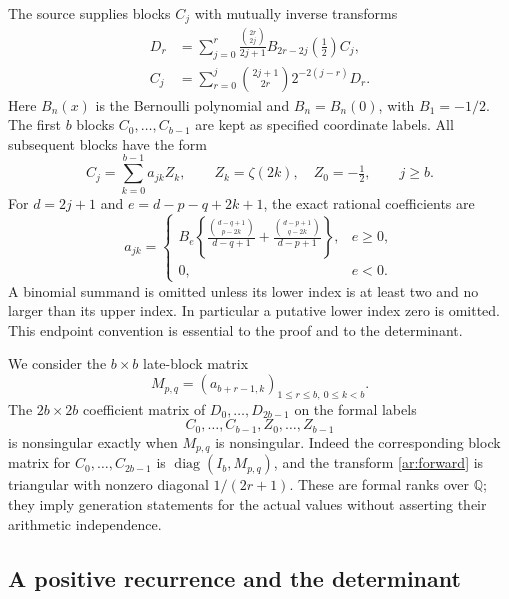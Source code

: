 The source supplies blocks $C_j$ with mutually inverse transforms
\begin{align}
 D_r&=\sum_{j=0}^r
    \frac{\binom{2r}{2j}}{2j+1}B_{2r-2j}(\tfrac12)C_j,
       \label{ar:forward}\\
 C_j&=\sum_{r=0}^j
       \binom{2j+1}{2r}2^{-2(j-r)}D_r.
       \label{ar:backward}
\end{align}
Here $B_n(x)$ is the Bernoulli polynomial and $B_n=B_n(0)$, with
$B_1=-1/2$. The first $b$ blocks $C_0,\ldots,C_{b-1}$ are kept as
specified coordinate labels. All subsequent blocks have the form
\begin{equation}\label{ar:block}
 C_j=\sum_{k=0}^{b-1}a_{jk}Z_k,\qquad
 Z_k=\zeta(2k),\quad Z_0=-\tfrac12,\qquad j\ge b.
\end{equation}
For $d=2j+1$ and $e=d-p-q+2k+1$, the exact rational coefficients are
\begin{equation}\label{ar:entries}
 a_{jk}=\begin{cases}
 B_e\left\{
 \displaystyle\frac{\binom{d-q+1}{p-2k}}{d-q+1}
 +\displaystyle\frac{\binom{d-p+1}{q-2k}}{d-p+1}
 \right\},&e\ge0,\\[6pt]
 0,&e<0.
 \end{cases}
\end{equation}
A binomial summand is omitted unless its lower index is at least two
and no larger than its upper index. In particular a putative lower
index zero is omitted. This endpoint convention is essential to the
proof and to the determinant.

We consider the $b\times b$ late-block matrix
\begin{equation}\label{ar:M}
 M_{p,q}=(a_{b+r-1,k})_{1\le r\le b,\ 0\le k<b}.
\end{equation}
The $2b\times2b$ coefficient matrix of
$D_0,\ldots,D_{2b-1}$ on the formal labels
\[
           C_0,\ldots,C_{b-1},Z_0,\ldots,Z_{b-1}
\]
is nonsingular exactly when $M_{p,q}$ is nonsingular. Indeed the
corresponding block matrix for $C_0,\ldots,C_{2b-1}$ is
$\operatorname{diag}(I_b,M_{p,q})$, and the transform
\eqref{ar:forward} is triangular with nonzero diagonal
$1/(2r+1)$. These are formal ranks over $\mathbb Q$; they imply
generation statements for the actual values without asserting their
arithmetic independence.

\subsection{A positive recurrence and the determinant}

